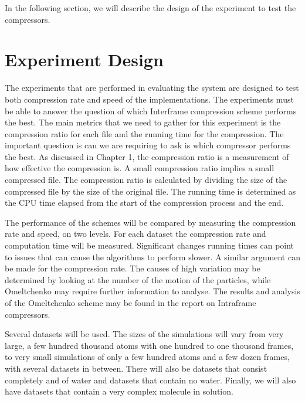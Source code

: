 \documentclass[a4paper,11pt]{report}
\begin{document}

In the following section, we will describe the design of the experiment to test the compressors.

\section{Experiment Design}

The experiments that are performed in evaluating the system are designed to test both compression rate and speed of the implementations. The experiments must be able to answer the question of which Interframe compression scheme performs the best. The main metrics that we need to gather for this experiment is the compression ratio for each file and the running time for the compression. The important question is can we are requiring to ask is which compressor performs the best. As discussed in Chapter 1, the compression ratio is a measurement of how effective the compression is. A small compression ratio implies a small compressed file. The compression ratio is calculated by dividing the size of the compressed file by the size of the original file. The running time is determined as the CPU time elapsed from the start of the compression process and the end.

The performance of the schemes will be compared by measuring the compression rate and speed, on two levels. For each dataset the compression rate and computation time will be measured. Significant changes running times can point to issues that can cause the algorithms to perform slower. A similar argument can be made for the compression rate. The causes of high variation may be determined by looking at the number of the motion of the particles, while Omeltchenko may require further information to analyse. The results and analysis of the Omeltchenko scheme may be found in the report on Intraframe compressors.

Several datasets will be used. The sizes of the simulations will vary from very large, a few hundred thousand atoms with one hundred to one thousand frames, to very small simulations of only a few hundred atoms and a few dozen frames, with several datasets in between. There will also be datasets that consist completely and of water and datasets that contain no water. Finally, we will also have datasets that contain a very complex molecule in solution.
\end{document}
